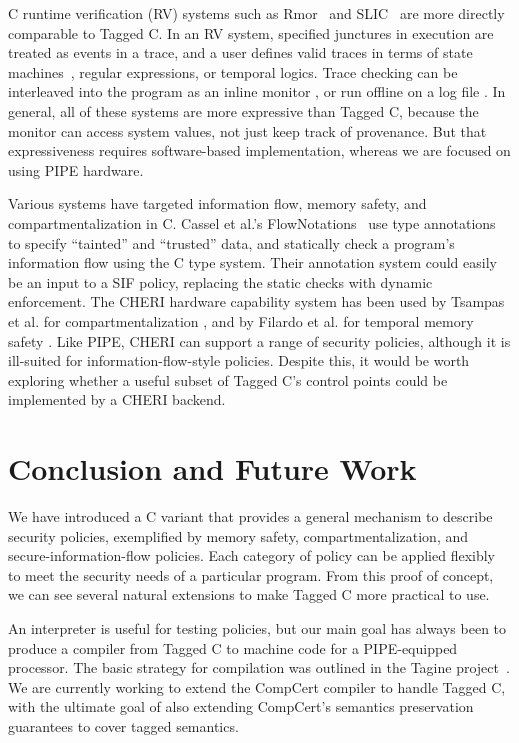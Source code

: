 \documentclass{llncs}
\begin{document}
C runtime verification (RV) systems such as {\sc Rmor}~\cite{Havelund08:RVC} and
SLIC~\cite{Ball02:slic}
are more directly comparable to Tagged C. In an RV system, specified junctures in
execution are treated as events in a trace, and a user defines valid traces
in terms of state machines~\cite{Schneider00:Automata}, regular expressions, or temporal logics.
Trace checking can be interleaved into the program as
an inline monitor \cite{Lundblad13:IRM}, or run offline on a log file \cite{Havelund22:LogScope}.
In general, all of these systems are more expressive than Tagged C, because the
monitor can access system values, not just keep track of provenance. But that expressiveness
requires software-based implementation, whereas we are focused on using PIPE hardware.

Various systems have targeted information flow, memory safety, and compartmentalization in C.
Cassel et al.'s FlowNotations~\cite{Cassel19:FlowNotation} use type annotations to specify ``tainted'' and ``trusted'' data,
and statically check a program's information flow using the C type system. Their annotation system
could easily be an input to a SIF policy, replacing the static checks with dynamic enforcement.
The CHERI hardware capability system has been used by Tsampas et al. for compartmentalization
\cite{Tsampas2017:TowardsAC}, and by Filardo et al. for temporal memory safety
\cite{NWF20:Cornucopia}. Like PIPE, CHERI can support a range of security policies,
although it is ill-suited for information-flow-style policies. Despite this, it would
be worth exploring whether a useful subset of Tagged C's control points could be implemented
by a CHERI backend.

\section{Conclusion and Future Work}
\label{sec:conclusion}

We have introduced a C variant that provides a general mechanism to describe security
policies, exemplified by memory safety, compartmentalization, and secure-information-flow
policies. Each category of policy can be applied flexibly to meet the security needs of
a particular program. From this proof of concept, we can see several natural extensions
to make Tagged C more practical to use.

An interpreter is useful for testing policies, but our main goal has always been to
produce a compiler from Tagged C to machine code for a PIPE-equipped processor.
The basic strategy for compilation was outlined in the Tagine project~\cite{Chhak21:Tagine}.
We are currently working to extend the CompCert compiler to handle Tagged C, with the ultimate
goal of also extending CompCert's semantics preservation guarantees to cover tagged semantics.
\end{document}
